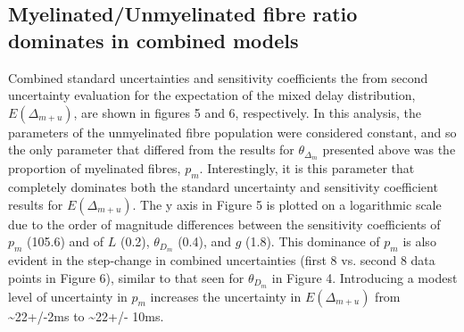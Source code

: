 





    
    
    
    
    


\subsection{Myelinated/Unmyelinated fibre ratio dominates in combined models}



Combined standard uncertainties and sensitivity coefficients the from second uncertainty evaluation for the expectation of the mixed delay distribution, $E(\Delta_{m+u})$, are shown in figures 5 and 6, respectively. In this analysis, the parameters of the unmyelinated fibre population were considered constant, and so the only parameter that differed from the results for $\theta_{\Delta_m}$ presented above was the proportion of myelinated fibres, $p_{m}$. Interestingly, it is this parameter that completely dominates both the standard uncertainty and sensitivity coefficient results for $E(\Delta_{m+u})$. The y axis in Figure 5 is plotted on a logarithmic scale due to the order of magnitude differences between the sensitivity coefficients of $p_{m}$ (105.6) and of $L$ (0.2), $\theta_{D_m}$ (0.4), and $g$ (1.8). This dominance of $p_{m}$ is also evident in the step-change in combined uncertainties (first 8 vs.  second 8 data points in Figure 6), similar to that seen for $\theta_{D_m}$ in Figure 4. Introducing a modest level of uncertainty in $p_{m}$ increases the uncertainty in $E(\Delta_{m+u})$ from \textasciitilde{}22+/-2ms to \textasciitilde{}22+/- 10ms.










